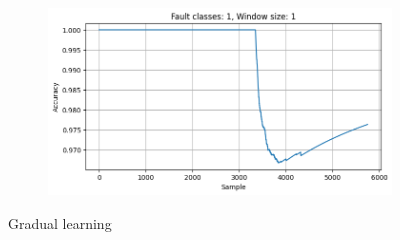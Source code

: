 \begin{figure}[ht]
\begin{subfigure}[b]{0.49\textwidth}
        \caption{}
    \end{subfigure}
    \hfill
    \begin{subfigure}[b]{0.49\textwidth}
        \includegraphics[width=\textwidth]{assets/design/gradual-learning-spectral-domain-anomaly60.png}
        \caption{}
    \end{subfigure}
    \caption{Gradual learning}
\end{figure}


